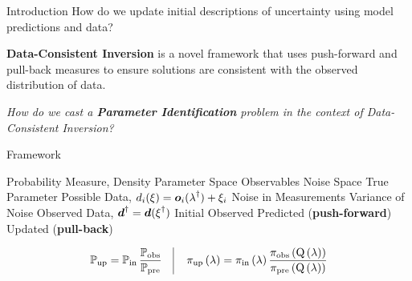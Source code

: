\begin{block}{Introduction}
\centering
            {\large How do we update initial descriptions of uncertainty using model predictions and data?}

             {\large \textbf{Data-Consistent Inversion} is a novel framework that uses push-forward and pull-back measures to ensure solutions are consistent with the observed distribution of data.}

             {\large \emph{How do we cast a \textbf{Parameter Identification} problem in the context of Data-Consistent Inversion?} }

\end{block}

\begin{block}{Framework}
\large
    \begin{itemize}
        \itembox{$ \PP, \; \pi $} Probability Measure, Density
         Parameter Space
         Observables
         Noise Space
        \itembox{$\param^\dagger\in\pspace$} True Parameter
         Possible Data, $d_i(\operatorname*{\xi}) = \boldsymbol{o}_i(\operatorname*{\lambda}^\dagger) + \xi_i$
        \itembox{$\noise^\dagger\in\nspace$} Noise in Measurements
         Variance of Noise
         Observed Data, $\boldsymbol{d}^\dagger = \boldsymbol{d}(\operatorname*{\xi}^\dagger)$
        \itembox{$ \initialP, \; \initial $} Initial
        \itembox{$ \observedP, \; \observed $} Observed
        \itembox{$ \predictedP, \; \predicted $} Predicted (\textbf{push-forward})
        \itembox{$ \updatedP, \; \updated $} Updated (\textbf{pull-back})
    \end{itemize}
\centering
    \begin{equation*}
            \dciP \quad \vline \quad \dci
    \end{equation*}

\end{block}

